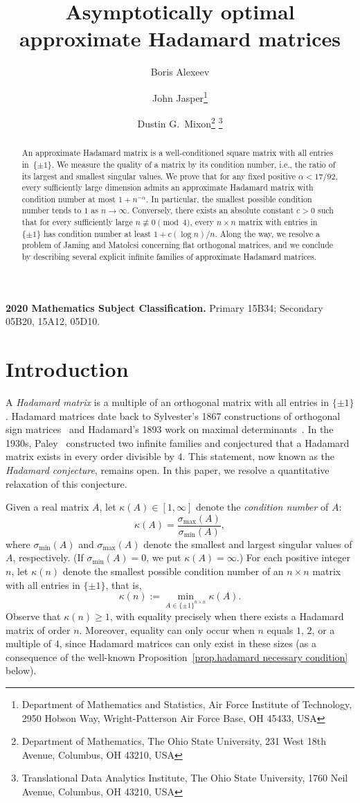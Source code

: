 \documentclass[11pt]{article}
\title{Asymptotically optimal approximate Hadamard matrices}
\author{Boris Alexeev \and John Jasper\thanks{Department of Mathematics and Statistics, Air Force Institute of Technology, 2950 Hobson Way, Wright-Patterson Air Force Base, OH 45433, USA} \and Dustin G.\ Mixon\thanks{Department of Mathematics, The Ohio State University, 231 West 18th Avenue, Columbus, OH 43210, USA} \thanks{Translational Data Analytics Institute, The Ohio State University, 1760 Neil Avenue, Columbus, OH 43210, USA}}
\date{}
\theoremstyle{plain}
\theoremstyle{definition}
\begin{document}
\maketitle


\begin{abstract}
An approximate Hadamard matrix is a well-conditioned square matrix with all entries in~\(\{\pm1\}\). 
We measure the quality of a matrix by its condition number, i.e., the ratio of its largest and smallest singular values. 
We prove that for any fixed positive \(\alpha<17/92\), every sufficiently large dimension admits an approximate Hadamard matrix with condition number at most \(1+n^{-\alpha}\). 
In particular, the smallest possible condition number tends to \(1\) as \(n\to\infty\). 
Conversely, there exists an absolute constant \(c>0\) such that for every sufficiently large \(n\not\equiv0\pmod4\), every \(n\times n\) matrix with entries in \(\{\pm1\}\) has condition number at least \(1+c(\log n)/n\). 
Along the way, we resolve a problem of Jaming and Matolcsi concerning flat orthogonal matrices, and we conclude by describing several explicit infinite families of approximate Hadamard matrices.
\end{abstract}



\noindent\textbf{2020 Mathematics Subject Classification.}
Primary 15B34; Secondary 05B20, 15A12, 05D10.

\section{Introduction}

A \textit{Hadamard matrix} is a multiple of an orthogonal matrix with all entries in $\{\pm1\}$.
Hadamard matrices date back to Sylvester's 1867 constructions of orthogonal sign matrices~\cite{Sylvester:67} and Hadamard's 1893 work on maximal determinants~\cite{Hadamard:93}. 
In the 1930s, Paley~\cite{Paley:33} constructed two infinite families and conjectured that a Hadamard matrix exists in every order divisible by \(4\). 
This statement, now known as the \emph{Hadamard conjecture}, remains open.
In this paper, we resolve a quantitative relaxation of this conjecture.

Given a real matrix $A$, let $\kappa(A)\in[1,\infty]$ denote the \textit{condition number} of $A$: 
\[
\kappa(A)=\frac{\sigma_{\max}(A)}{\sigma_{\min}(A)},
\]
where $\sigma_{\min}(A)$ and $\sigma_{\max}(A)$ denote the smallest and largest singular values of $A$, respectively.
(If $\sigma_{\min}(A)=0$, we put $\kappa(A)=\infty$.)
For each positive integer $n$, let $\kappa(n)$ denote the smallest possible condition number of an $n\times n$ matrix with all entries in $\{\pm1\}$, that is,
\[
\kappa(n)
:=\min_{A\in\{\pm1\}^{n\times n}}\kappa(A).
\]
Observe that $\kappa(n)\geq1$, with equality precisely when there exists a Hadamard matrix of order $n$. Moreover, equality can only occur when \(n\) equals \(1\), \(2\), or a multiple of $4$, since Hadamard matrices can only exist in these sizes (as a consequence of the well-known Proposition~\ref{prop.hadamard necessary condition} below).
\end{document}
